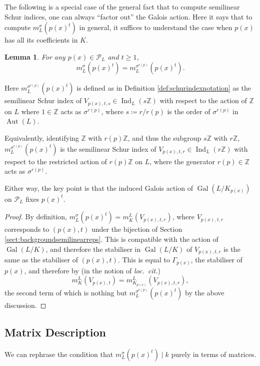 \documentclass[10pt, reqno, hidelinks]{amsart}
\DeclareMathOperator{\Gal}{Gal}
\DeclareMathOperator{\Ind}{Ind}
\DeclareMathOperator{\Aut}{Aut}
\newcommand{\bZ}{{\mathbb Z}}
\newcommand{\sP}{{\mathcal P}}
\numberwithin{thm}{subsection}
\newtheorem{lemma}[thm]{Lemma}
\theoremstyle{definition}
\begin{document}
The following is a special case of the general fact that to compute semilinear Schur indices, one can always ``factor out'' the Galois action. Here it says that to compute $m_L^{\sigma}(p(x)^t)$ in general, it suffices to understand the case when $p(x)$ has all its coefficients in $K$.

\begin{lemma}\label{lem:reductiontopolyoverK}
	For any $p(x) \in \sP_L$ and $t \geq 1$,
	\[
		m_L^{\sigma}(p(x)^t) = m_L^{\sigma^{r(p)}}(p(x)^t).
	\]
\end{lemma}

Here $m_L^{\sigma^{r(p)}}(p(x)^t)$ is defined as in Definition \ref{def:schurindexnotation} as the semilinear Schur index of $V_{p(x),t, s} \in \Ind_{L}(s \bZ)$ with respect to the action of $\bZ$ on $L$ where $1 \in \bZ$ acts as $\sigma^{r(p)}$, where $s \coloneqq r / r(p)$ is the order of $\sigma^{r(p)}$ in $\Aut(L)$. 

Equivalently, identifying $\bZ$ with $r(p)\bZ$, and thus the subgroup $s \bZ$ with $r \bZ$, $m_L^{\sigma^{r(p)}}(p(x)^t)$ is the semilinear Schur index of $V_{p(x),t, r} \in \Ind_{L}(r \bZ)$ with respect to the restricted action of $r(p)\bZ$ on $L$, where the generator $r(p) \in \bZ$ acts as $\sigma^{r(p)}$.

Either way, the key point is that the induced Galois action of $\Gal(L / K_{p(x)})$ on $\sP_L$ fixes $p(x)^t$.

\begin{proof}
	By definition, $m_L^{\sigma}(p(x)^t) = m^L_K(V_{p(x),t,r})$, where $V_{p(x),t,r}$ corresponds to $(p(x),t)$ under the bijection of Section \ref{sect:backgroundsemilinearreps}. This is compatible with the action of $\Gal(L/K)$, and therefore the stabiliser in $\Gal(L/K)$ of $V_{p(x),t,r}$ is the same as the stabiliser of $(p(x),t)$. This is equal to $\Gamma_{p(x)}$, the stabiliser of $p(x)$, and therefore by \cite[Prop.\ 7.3(7)]{TAYSchur} (in the notion of \emph{loc.~cit.})
	\[
	m_K^L(V_{p(x),t}) = m_{K_{p(x)}}^L(V_{p(x),t,r}),
	\]
	the second term of which is nothing but $m_L^{\sigma^{r(p)}}(p(x)^t)$ by the above discussion.
\end{proof}

\subsection{Matrix Description}

We can rephrase the condition that $m_L^{\sigma}(p(x)^t) \mid k$ purely in terms of matrices.
\end{document}
